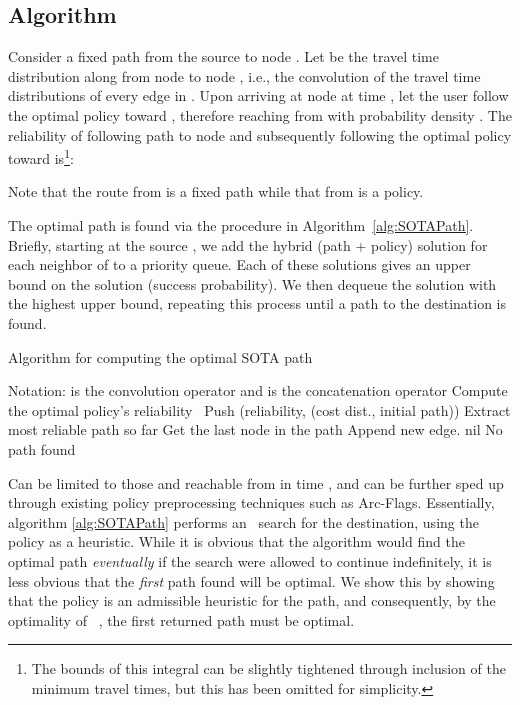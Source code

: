 \documentclass[oribibl]{llncs}
\begin{document}
		\subsection{Algorithm}

			Consider a fixed path  from the source  to node .
			Let  be the travel time distribution along  from node  to node ,
			i.e., the convolution of the travel time distributions of every edge in .
			Upon arriving at node  at time , let the user follow the optimal policy
			toward , therefore reaching  from  with probability density
			.
			The reliability of following path  to node  and subsequently
			following the optimal policy toward  is\footnote
			{
				The bounds of this integral can be slightly tightened through
				inclusion of the minimum travel times, but this has been omitted for simplicity.
			}:
			
			Note that the route from  is a fixed path while that from
			 is a policy.

			The optimal path is found via the procedure in Algorithm~\ref{alg:SOTAPath}.
			Briefly, starting at the source , we add the hybrid (path + policy)
			solution  for each neighbor  of  to a priority queue.
			Each of these solutions gives an upper bound on the solution (success probability).
			We then dequeue the solution with the highest upper bound,
			repeating this process until a path to the destination is found.

			\begin{algorithm}[t]
				\caption{Algorithm for computing the optimal SOTA path}
				\label{alg:SOTAPath}
				\begin{algorithmic}
					\State Notation:
					  is the convolution operator and  is the concatenation operator
					\ForAll{, }
						\State Compute the optimal policy's reliability\footnotemark~
					\EndFor
					\State 
					\State 
						\Comment Push (reliability, (cost dist., initial path))
						\State 
							\Comment Extract most reliable path so far
						\State 
							\Comment Get the last node in the path
						\If{}
							\State \Return 
						\EndIf
						\ForAll{}
							\State 
								\Comment Append new edge.
						\EndFor
					\EndWhile
					\State \Return nil  \Comment No path found
				\end{algorithmic}
			\end{algorithm}
			\footnotetext
			{
				Can be limited to those  and  reachable from  in time ,
				and can be further sped up through existing policy preprocessing techniques
				such as Arc-Flags.
			}
			Essentially, algorithm \ref{alg:SOTAPath} performs an ~search for the destination, using the policy
			as a heuristic.
			While it is obvious that the algorithm would find the optimal path \textit{eventually} if the search were
			allowed to continue indefinitely, it is less obvious that the \textit{first} path found will be optimal.
			We show this by showing that the policy is an admissible heuristic for the path,
			and consequently, by the optimality of ~\cite{dechter1985}, the first returned path must be optimal.
\end{document}
